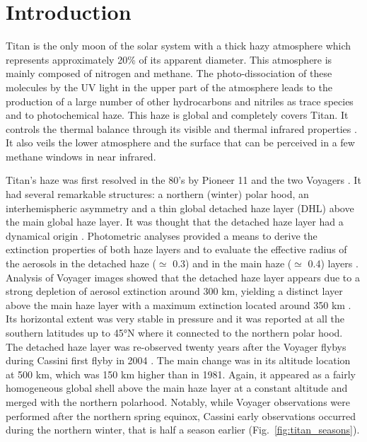 \section{Introduction}

Titan is the only moon of the solar system with a thick hazy atmosphere which represents approximately 20\% of its apparent
diameter. This atmosphere is mainly composed of nitrogen and methane. The photo-dissociation of these molecules by the
UV light in the upper part of the atmosphere leads to the production of a large number of other hydrocarbons and nitriles as
trace species and to photochemical haze. This haze is global and completely covers Titan. It controls
the thermal balance through its visible and thermal infrared properties \citep[\eg][]{Bezard2018}.
It also veils the lower atmosphere and the surface that can be perceived in a few methane windows in near infrared.

Titan's haze was first resolved in the 80's by Pioneer 11 \citep{Smith1980} and the two Voyagers
\citep{Smith1981, Smith1982, Sromovsky1981}. It had several remarkable structures: a northern (winter)
polar hood, an interhemispheric asymmetry and a thin global detached haze layer (DHL) above the main global haze layer. It was
thought that the detached haze layer had a dynamical origin \citep{Smith1981}. Photometric analyses provided a means
to derive the extinction properties of both haze layers and to evaluate the effective radius of the aerosols in the detached
haze ($\simeq$ 0.3\micron) and in the main haze ($\simeq$ 0.4\micron) layers \citep{Rages1983, Rages1983a}. Analysis of Voyager images showed
that the detached haze layer appears due to a strong depletion of aerosol extinction around 300 km, yielding a distinct
layer above the main haze layer with a maximum extinction located around 350 km \citep{Rages1983}. Its horizontal extent was
very stable in pressure and it was reported at all the southern latitudes up to \ang{45}N where it connected to the northern
polar hood. The detached haze layer was re-observed twenty years after the Voyager flybys during Cassini first flyby in 2004
\citep{Porco2005}. The main change was in its altitude location at 500 km, which was 150 km higher than in 1981.
Again, it appeared as a fairly homogeneous global shell above the main haze layer at a constant altitude and
merged with the northern polarhood. Notably, while Voyager observations were performed after the northern spring equinox,
Cassini early observations occurred during the northern winter, that is half a season earlier (Fig.~\ref{fig:titan_seasons}).

